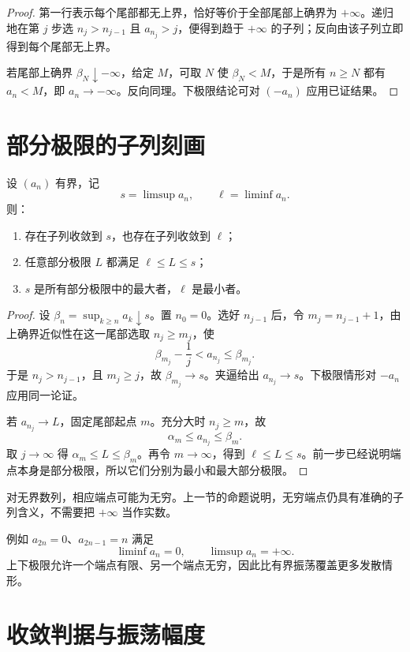 \begin{proof}
第一行表示每个尾部都无上界，恰好等价于全部尾部上确界为
\(+\infty\)。递归地在第 \(j\) 步选 \(n_j>n_{j-1}\) 且
\(a_{n_j}>j\)，便得到趋于 \(+\infty\) 的子列；反向由该子列立即得到每个尾部无上界。

若尾部上确界 \(\beta_N\downarrow-\infty\)，给定 \(M\)，可取 \(N\)
使 \(\beta_N<M\)，于是所有 \(n\ge N\) 都有 \(a_n<M\)，即
\(a_n\to-\infty\)。反向同理。下极限结论可对 \((-a_n)\) 应用已证结果。
\end{proof}

\section{部分极限的子列刻画}


\begin{theorem}[有界数列的子列刻画]
设 \((a_n)\) 有界，记
\[
 s=\limsup a_n,\qquad \ell=\liminf a_n.
\]
则：
\begin{enumerate}
 \item 存在子列收敛到 \(s\)，也存在子列收敛到 \(\ell\)；
 \item 任意部分极限 \(L\) 都满足 \(\ell\le L\le s\)；
 \item \(s\) 是所有部分极限中的最大者，\(\ell\) 是最小者。
\end{enumerate}
\end{theorem}

\begin{proof}
设 \(\beta_n=\sup_{k\ge n}a_k\downarrow s\)。置 \(n_0=0\)。选好 \(n_{j-1}\) 后，令 \(m_j=n_{j-1}+1\)，由上确界近似性在这一尾部选取 \(n_j\ge m_j\)，使
\[
 \beta_{m_j}-\frac1j<a_{n_j}\le\beta_{m_j}.
\]
于是 \(n_j>n_{j-1}\)，且 \(m_j\ge j\)，故 \(\beta_{m_j}\to s\)。夹逼给出 \(a_{n_j}\to s\)。下极限情形对 \(-a_n\) 应用同一论证。

若 \(a_{n_j}\to L\)，固定尾部起点 \(m\)。充分大时 \(n_j\ge m\)，故
\[
 \alpha_m\le a_{n_j}\le\beta_m.
\]
取 \(j\to\infty\) 得 \(\alpha_m\le L\le\beta_m\)。再令 \(m\to\infty\)，得到 \(\ell\le L\le s\)。前一步已经说明端点本身是部分极限，所以它们分别为最小和最大部分极限。
\end{proof}

对无界数列，相应端点可能为无穷。上一节的命题说明，无穷端点仍具有准确的子列含义，不需要把 \(+\infty\) 当作实数。

例如 \(a_{2n}=0\)、\(a_{2n-1}=n\) 满足
\[
 \liminf a_n=0,\qquad \limsup a_n=+\infty.
\]
上下极限允许一个端点有限、另一个端点无穷，因此比有界振荡覆盖更多发散情形。

\section{收敛判据与振荡幅度}


